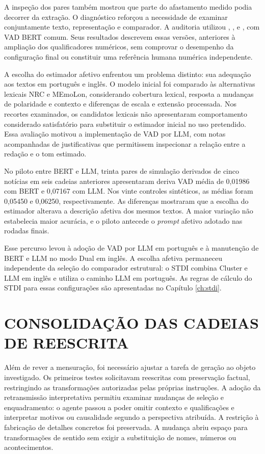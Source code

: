 A inspeção dos pares também mostrou que parte do afastamento medido podia decorrer da extração. O diagnóstico reforçou a necessidade de examinar conjuntamente texto, representação e comparador. A auditoria utilizou , ,  e , com VAD BERT comum. Seus resultados descrevem essas versões, anteriores à ampliação dos qualificadores numéricos, sem comprovar o desempenho da configuração final ou constituir uma referência humana numérica independente.

A escolha do estimador afetivo enfrentou um problema distinto: sua adequação aos textos em português e inglês. O modelo inicial  foi comparado às alternativas lexicais NRC e MEmoLon, considerando cobertura lexical, resposta a mudanças de polaridade e contexto e diferenças de escala e extensão processada. Nos recortes examinados, os candidatos lexicais não apresentaram comportamento considerado satisfatório para substituir o estimador inicial no uso pretendido. Essa avaliação motivou a implementação de VAD por LLM, com notas acompanhadas de justificativas que permitissem inspecionar a relação entre a redação e o tom estimado.

No piloto entre BERT e LLM, trinta pares de simulação derivados de cinco notícias em seis cadeias anteriores apresentaram deriva VAD média de 0,01986 com BERT e 0,07167 com LLM. Nos vinte controles sintéticos, as médias foram 0,05450 e 0,06250, respectivamente. As diferenças mostraram que a escolha do estimador alterava a descrição afetiva dos mesmos textos. A maior variação não estabelecia maior acurácia, e o piloto antecede o \textit{prompt} afetivo adotado nas rodadas finais.

Esse percurso levou à adoção de VAD por LLM em português e à manutenção de BERT e LLM no modo Dual em inglês. A escolha afetiva permaneceu independente da seleção do comparador estrutural: o STDI combina Cluster e LLM em inglês e utiliza o caminho LLM em português. As regras de cálculo do STDI para essas configurações são apresentadas no Capítulo \ref{ch:stdi}.

\section{CONSOLIDAÇÃO DAS CADEIAS DE REESCRITA}
\label{sec:consolidacao-cadeias}

Além de rever a mensuração, foi necessário ajustar a tarefa de geração ao objeto investigado. Os primeiros testes solicitavam reescritas com preservação factual, restringindo as transformações autorizadas pelas próprias instruções. A adoção da retransmissão interpretativa permitiu examinar mudanças de seleção e enquadramento: o agente passou a poder omitir contexto e qualificações e interpretar motivos ou causalidade segundo a perspectiva atribuída. A restrição à fabricação de detalhes concretos foi preservada. A mudança abriu espaço para transformações de sentido sem exigir a substituição de nomes, números ou acontecimentos.

